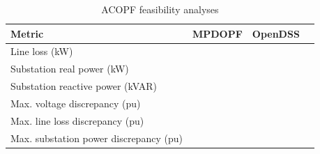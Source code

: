 \documentclass[../../outputs/main.tex]{subfiles}
\begin{document}
\begin{table}[h!]
    \centering
    \caption{ACOPF feasibility analyses}
    \begin{tabular}{|l|c|c|c|}
    \hline
    \textbf{Metric} & \textbf{MPDOPF} & \textbf{OpenDSS} \\ \hline
    Line loss (kW) &   &  \\ \hline
    Substation real power (kW) &    &   \\ \hline
    Substation reactive power (kVAR) &    &   \\ \hline
    Max. voltage discrepancy (pu) &    &    \\ \hline
    Max. line loss discrepancy (pu) &    &   \\ \hline
    Max. substation power discrepancy (pu) &     &   \\ \hline
    \end{tabular}
    \label{table:feas-copf-10-20-30}
\end{table}

\end{document}
